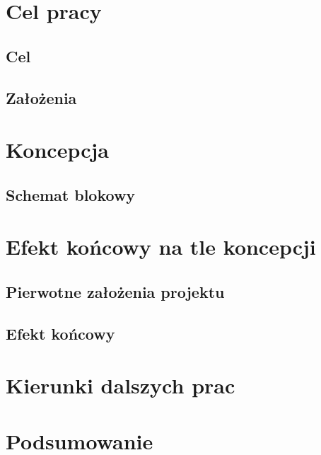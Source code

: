 \documentclass[a4paper, 11pt]{report}
\begin{document}
\chapter{Cel pracy}
\section{Cel}
\section{Założenia}


\chapter{Koncepcja}
\section{Schemat blokowy}

\chapter{Efekt końcowy na tle koncepcji}
\section{Pierwotne założenia projektu}
\section{Efekt końcowy}

\chapter{Kierunki dalszych prac}

\chapter{Podsumowanie}

\begin{thebibliography}{99}


\end{thebibliography}
\end{document}
